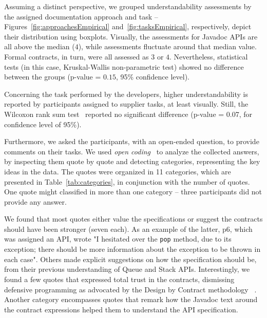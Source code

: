 Assuming a distinct perspective, we grouped understandability assessments by the assigned documentation approach and task -- Figures~\ref{fig:approachesEmpirical} and~\ref{fig:tasksEmpirical}, respectively, depict their distribution using boxplots.
Visually, the assessments for Javadoc APIs are all above the median ($4$), while \contractjdoc{} assessments fluctuate around that median value. Formal contracts, in turn, were all assessed as $3$ or $4$.  
Nevertheless, statistical tests (in this case, Kruskal-Wallis non-parametric test) showed no difference between the groups (p-value = $0.15$, 95\% confidence level).

Concerning the task performed by the developers, higher understandability is reported by participants assigned to supplier tasks, at least visually. Still, the Wilcoxon rank sum test~\cite{statistical} reported no significant difference (p-value = 0.07, for confidence level of 95\%).

Furthermore, we asked the participants, with an open-ended question, to provide comments on their tasks. 
We used \emph{open coding}~\cite{openCoding} to analyze the collected answers, by inspecting them quote by quote and detecting categories, representing the key ideas in the data.
The quotes were organized in 11 categories, which are presented in Table~\ref{tab:categories}, in conjunction with the number of quotes. One quote might classified in more than one category -- three participants did not provide any answer.

We found that most quotes either value the specifications or suggest the contracts should have been stronger (seven each). As an example of the latter, p6, which was assigned an \contractjdoc{} API, wrote "I hesitated over the \texttt{pop} method, due to its exception; there should be more information about the exception to be thrown in each case". 
Others made explicit suggestions on how the specification should be, from their previous understanding of Queue and Stack APIs.
Interestingly, we found a few quotes that expressed total trust in the contracts, dismissing defensive programming as advocated by the Design by Contract methodology ~\cite{dbc}.
Another category encompasses quotes that remark how the Javadoc text around the contract expressions helped them to understand the API specification. 

